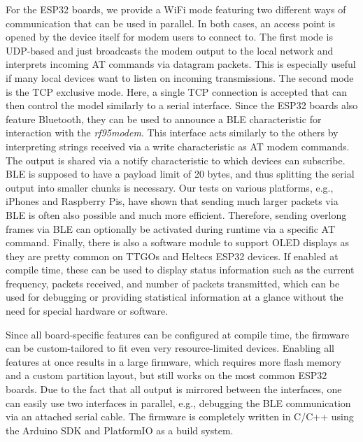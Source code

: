 For the ESP32 boards, we provide a WiFi mode featuring two different ways of communication that can be used in parallel. 
In both cases, an access point is opened by the device itself for modem users to connect to.
The first mode is UDP-based and just broadcasts the modem output to the local network and interprets incoming AT commands via datagram packets. 
This is especially useful if many local devices want to listen on incoming transmissions. 
The second mode is the TCP exclusive mode. 
Here, a single TCP connection is accepted that can then control the model similarly to a serial interface. 
Since the ESP32 boards also feature Bluetooth, they can be used to announce a BLE characteristic for interaction with the \textit{rf95modem}. 
This interface acts similarly to the others by interpreting strings received via a write characteristic as AT modem commands. 
The output is shared via a notify characteristic to which devices can subscribe. 
BLE is supposed to have a payload limit of 20 bytes, and thus splitting the serial output into smaller chunks is necessary. 
Our tests on various platforms, e.g., iPhones and Raspberry Pis, have shown that sending much larger packets via BLE is often also possible and much more efficient. 
Therefore, sending overlong frames via BLE can optionally be activated during runtime via a specific AT command.
Finally, there is also a software module to support OLED displays as they are pretty common on TTGOs and Heltecs ESP32 devices. 
If enabled at compile time, these can be used to display status information such as the current frequency, packets received, and number of packets transmitted, which can be used for debugging or providing statistical information at a glance without the need for special hardware or software.

Since all board-specific features can be configured at compile time, the firmware can be custom-tailored to fit even very resource-limited devices. 
Enabling all features at once results in a large firmware, which requires more flash memory and a custom partition layout, but still works on the most common ESP32 boards. 
Due to the fact that all output is mirrored between the interfaces, one can easily use two interfaces in parallel, e.g., debugging the BLE communication via an attached serial cable.
The firmware is completely written in C/C++ using the Arduino SDK and PlatformIO as a build system.


